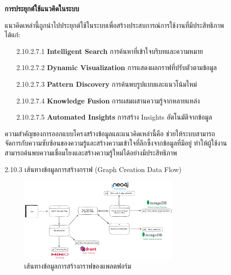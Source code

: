 \documentclass[12pt,a4paper]{article}
\begin{document}
\begin{enumerate}[leftmargin=2cm]
\begin{enumerate}
{\begin{enumerate}
            \vspace{0.5cm}

            \textbf{การประยุกต์ใช้แนวคิดในระบบ}

            \hspace{1cm}แนวคิดเหล่านี้ถูกนำไปประยุกต์ใช้ในระบบเพื่อสร้างประสบการณ์การใช้งานที่มีประสิทธิภาพ ได้แก่:

            \begin{enumerate}
                \item[2.10.2.7.1] \textbf{Intelligent Search} การค้นหาที่เข้าใจบริบทและความหมาย
                \item[2.10.2.7.2] \textbf{Dynamic Visualization} การแสดงผลกราฟที่ปรับตัวตามข้อมูล
                \item[2.10.2.7.3] \textbf{Pattern Discovery} การค้นพบรูปแบบและแนวโน้มใหม่
                \item[2.10.2.7.4] \textbf{Knowledge Fusion} การผสมผสานความรู้จากหลายแหล่ง
                \item[2.10.2.7.5] \textbf{Automated Insights} การสร้าง Insights อัตโนมัติจากข้อมูล
            \end{enumerate}

            \hspace{1cm}ความสำคัญของการออกแบบโครงสร้างข้อมูลและแนวคิดเหล่านี้คือ ช่วยให้ระบบสามารถจัดการกับความซับซ้อนของความรู้และสร้างความเข้าใจที่ลึกซึ้งจากข้อมูลที่มีอยู่ ทำให้ผู้ใช้งานสามารถค้นพบความเชื่อมโยงและสร้างความรู้ใหม่ได้อย่างมีประสิทธิภาพ

            \end{enumerate}
        }

        \vspace{10cm}

        \item[2.10.3] เส้นทางข้อมูลการสร้างกราฟ (Graph Creation Data Flow)

        \begin{figure}[H]
            \centering
            \includegraphics[width=0.8\textwidth]{images/co-p-data_flow_concept.png}
            \caption{เส้นทางข้อมูลการสร้างกราฟของแพลตฟอร์ม}
            \label{fig:data_flow_concept}
        \end{figure}


\end{enumerate}
\end{enumerate}
\end{document}
